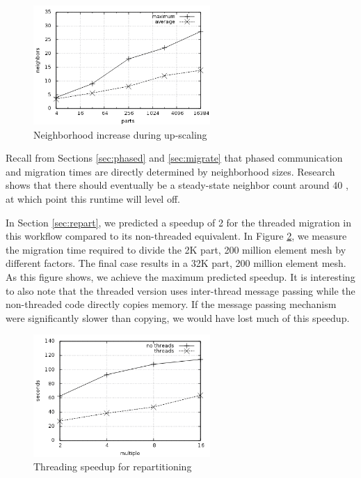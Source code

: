 \documentclass[final,1p,times]{elsarticle}
\begin{document}
\begin{figure}[!ht]
\begin{center}
\caption{Neighborhood increase during up-scaling}
\label{fig:neighbor}
\includegraphics[width=0.6\textwidth]{neighbor.png}
\end{center}
\end{figure}

Recall from Sections \ref{sec:phased} and \ref{sec:migrate} that
phased communication and migration times are directly determined
by neighborhood sizes.
Research shows that there should eventually be a steady-state
neighbor count around 40 \cite{zhou2010petascale}, at which point this
runtime will level off.

In Section \ref{sec:repart}, we predicted a speedup of 2 for
the threaded migration in this workflow compared to its non-threaded
equivalent.
In Figure \ref{fig:repart}, we measure the migration time required
to divide the 2K part, 200 million element mesh by different factors.
The final case results in a 32K part, 200 million element mesh.
As this figure shows, we achieve the maximum predicted speedup.
It is interesting to also note that the threaded version uses
inter-thread message passing while the non-threaded code directly
copies memory.
If the message passing mechanism were significantly slower than
copying, we would have lost much of this speedup.

\begin{figure}[!ht]
\begin{center}
\caption{Threading speedup for repartitioning}
\label{fig:repart}
\includegraphics[width=0.6\textwidth]{repart.png}
\end{center}
\end{figure}
\end{document}
